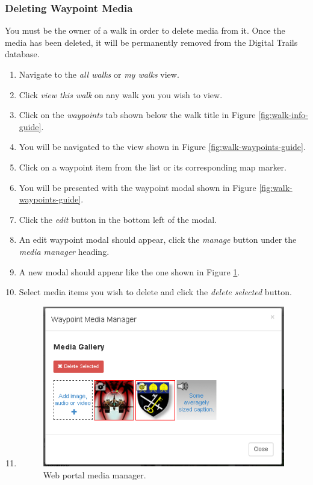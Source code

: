 \documentclass[11pt,a4paper]{report}
\begin{document}
\subsubsection{Deleting Waypoint Media}

You must be the owner of a walk in order to delete media from it. Once the media has been deleted, it will be permanently removed from the Digital Trails database.

\begin{enumerate}
\item Navigate to the \emph{all walks} or \emph{my walks} view.
\item Click \emph{view this walk} on any walk you you wish to view.
\item Click on the \emph{waypoints} tab shown below the walk title in Figure \ref{fig:walk-info-guide}.
\item You will be navigated to the view shown in Figure \ref{fig:walk-waypoints-guide}.
\item Click on a waypoint item from the list or its corresponding map marker.
\item You will be presented with the waypoint modal shown in Figure \ref{fig:walk-waypoints-guide}.
\item Click the \emph{edit} button in the bottom left of the modal.
\item An edit waypoint modal should appear, click the \emph{manage} button under the \emph{media manager} heading.
\item A new modal should appear like the one shown in Figure \ref{fig:media-gallery-guide}.
\item Select media items you wish to delete and click the \emph{delete selected} button.
\item 

\begin{figure}[h]
\centering
\includegraphics[width=0.7\linewidth]{./img/webportal/media-gallery}
\caption{Web portal media manager.}
\label{fig:media-gallery-guide}
\end{figure}


\end{enumerate}
\end{document}
